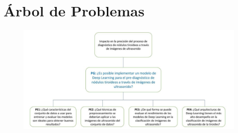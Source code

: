 
\appendix
\setcounter{section}{0}%
\renewcommand{\thesection}{\Alph{section}}%
	
	\section{Árbol de Problemas}
	\label{anexo1}
	\begin{figure}[h]
		\begin{center}
			\includegraphics[width=1.00\textwidth]{anexos/arb_problemas.jpg}
		\end{center}
	\end{figure}
	\clearpage
	
